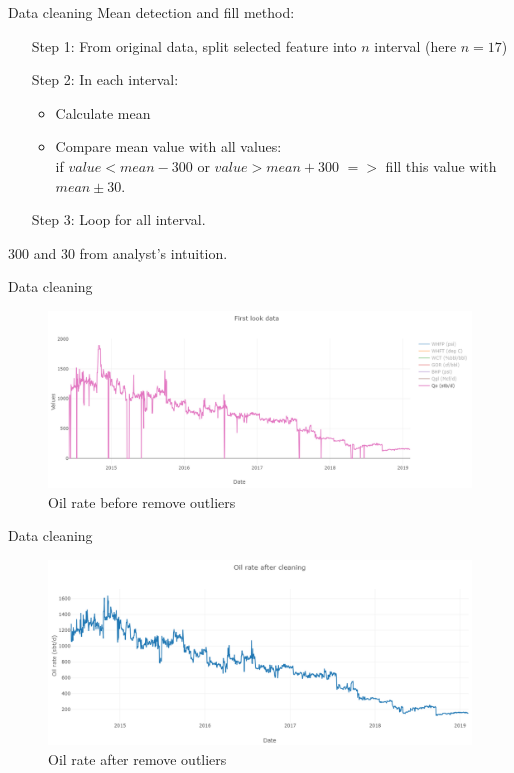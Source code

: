 \documentclass[xcolor=table, 11pt]{beamer}
\begin{document}
\begin{frame}{Data cleaning}
Mean detection and fill method:
    \begin{itemize}
        \item[Step 1:] From original data, split selected feature into $n$ interval (here $n = 17$)
        \item[Step 2:] In each interval:
            \begin{itemize}
                \item Calculate mean
                \item Compare mean value with all values:\\ 
                if $value < mean - 300$ or $value > mean + 300$ $=>$ fill this value with $mean \pm 30$.
            \end{itemize}
        \item [Step 3:] Loop for all interval.
    \end{itemize}
300 and 30 from analyst's intuition.
\end{frame}
\begin{frame}{Data cleaning}
    \begin{figure}
        \centering
        \includegraphics[scale=0.38]{fig/q_oil_before.PNG}
        \caption{Oil rate before remove outliers}
        \label{fig:q_oil_before}
    \end{figure}
\end{frame}
\begin{frame}{Data cleaning}
    \begin{figure}
        \centering
        \includegraphics[scale=0.38]{fig/q_oil_after.PNG}
        \caption{Oil rate after remove outliers}
        \label{fig:q_oil_after}
    \end{figure}
\end{frame}
\end{document}
